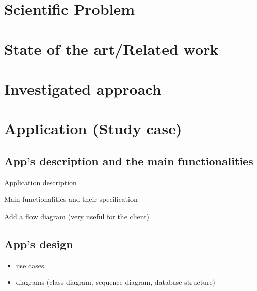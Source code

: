 \documentclass[twoside,runningheads,a4paper,11pt]{report}
\begin{document}
\chapter{Scientific Problem}
\label{section:scientificProblem}



\chapter{State of the art/Related work}
\label{chapter:stateOfArt}








\chapter{Investigated approach}
\label{chapter:proposedApproach}













\chapter{Application (Study case)}
\label{chapter:application}


\section{App's description  and the main functionalities}
\label{section:appDescription}

Application description

Main functionalities and their specification 

Add a flow diagram (very useful for the client)


\section{App's design}
\label{section:appDesign}

\begin{itemize}
	\item use cases
	\item diagrams (class diagram, sequence diagram, database structure)
\end{itemize}
\end{document}
